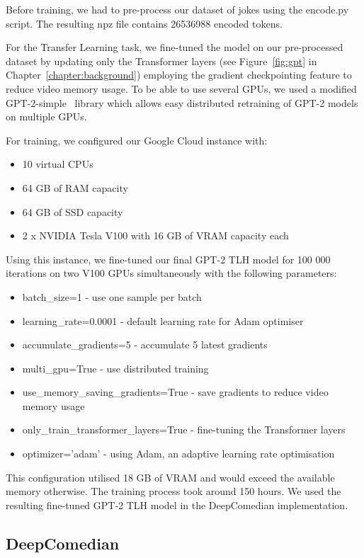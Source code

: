 Before training, we had to pre-process our dataset of jokes using the encode.py script. The resulting npz file contains 26536988 encoded tokens.

For the Transfer Learning task, we fine-tuned the model on our pre-processed dataset by updating only the Transformer layers (see Figure~\ref{fig:gpt} in Chapter~\ref{chapter:background}) employing the gradient checkpointing feature to reduce video memory usage. To be able to use several GPUs, we used a modified GPT-2-simple~\parencite{gpt2simple} library which allows easy distributed retraining of GPT-2 models on multiple GPUs.

For training, we configured our Google Cloud instance with:
\begin{itemize}
    \item 10 virtual CPUs
    \item 64 GB of RAM capacity
    \item 64 GB of SSD capacity
    \item 2 x NVIDIA Tesla V100 with 16 GB of VRAM capacity each
\end{itemize}

Using this instance, we fine-tuned our final GPT-2 TLH model for 100 000 iterations on two V100 GPUs simultaneously with the following parameters:
\begin{itemize}
    \item batch\_size=1 - use one sample per batch 
    \item learning\_rate=0.0001 - default learning rate for Adam optimiser
    \item accumulate\_gradients=5 - accumulate 5 latest gradients
    \item multi\_gpu=True - use distributed training
    \item use\_memory\_saving\_gradients=True - save gradients to reduce video memory usage
    \item only\_train\_transformer\_layers=True - fine-tuning the Transformer layers
    \item optimizer='adam' - using Adam, an adaptive learning rate optimisation
\end{itemize}
This configuration utilised 18 GB of VRAM and would exceed the available memory otherwise. The training process took around 150 hours. We used the resulting fine-tuned GPT-2 TLH model in the DeepComedian implementation.

\subsection{DeepComedian}

